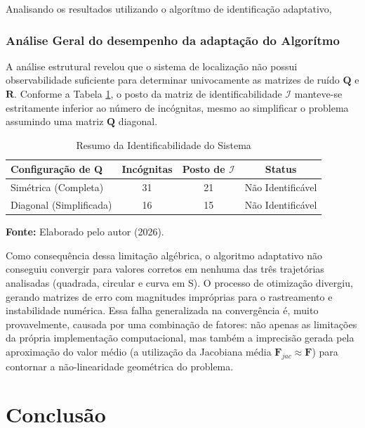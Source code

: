 \documentclass[journal]{IEEEtran}
\begin{document}
Analisando os resultados utilizando o algorítmo de identificação adaptativo,

\subsubsection{Análise Geral do desempenho da adaptação do Algorítmo}

A análise estrutural revelou que o sistema de localização não possui observabilidade suficiente para determinar univocamente as matrizes de ruído $\mathbf{Q}$ e $\mathbf{R}$. Conforme a Tabela \ref{tab:identificabilidade}, o posto da matriz de identificabilidade $\mathcal{I}$ manteve-se estritamente inferior ao número de incógnitas, mesmo ao simplificar o problema assumindo uma matriz $\mathbf{Q}$ diagonal.

\begin{table}[h]
\centering
\caption{Resumo da Identificabilidade do Sistema}
\label{tab:identificabilidade}
\begin{tabular}{lccc}
\hline
\textbf{Configuração de Q} & \textbf{Incógnitas} & \textbf{Posto de $\mathcal{I}$} & \textbf{Status} \\ \hline
Simétrica (Completa)       & 31                  & 21               & Não Identificável \\
Diagonal (Simplificada)    & 16                  & 15               & Não Identificável \\ \hline
\end{tabular}
        \vspace{2pt}
        \centerline{\footnotesize \textbf{Fonte:} Elaborado pelo autor (2026).}
\end{table}

Como consequência dessa limitação algébrica, o algoritmo adaptativo não conseguiu convergir para valores corretos em nenhuma das três trajetórias analisadas (quadrada, circular e curva em S). O processo de otimização divergiu, gerando matrizes de erro com magnitudes impróprias para o rastreamento e instabilidade numérica. Essa falha generalizada na convergência é, muito provavelmente, causada por uma combinação de fatores: não apenas as limitações da própria implementação computacional, mas também a imprecisão gerada pela aproximação do valor médio (a utilização da Jacobiana média $\mathbf{F}_{jac} \approx \mathbf{F}$) para contornar a não-linearidade geométrica do problema.
\section{Conclusão}
\end{document}
